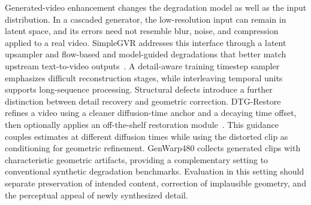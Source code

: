 Generated-video enhancement changes the degradation model as well as the input distribution. In a cascaded generator, the low-resolution input can remain in latent space, and its errors need not resemble blur, noise, and compression applied to a real video. SimpleGVR addresses this interface through a latent upsampler and flow-based and model-guided degradations that better match upstream text-to-video outputs~\cite{simplegvr}. A detail-aware training timestep sampler emphasizes difficult reconstruction stages, while interleaving temporal units supports long-sequence processing. Structural defects introduce a further distinction between detail recovery and geometric correction. DTG-Restore refines a video using a cleaner diffusion-time anchor and a decaying time offset, then optionally applies an off-the-shelf restoration module~\cite{dtgrestore}. This guidance couples estimates at different diffusion times while using the distorted clip as conditioning for geometric refinement. GenWarp480 collects generated clips with characteristic geometric artifacts, providing a complementary setting to conventional synthetic degradation benchmarks. Evaluation in this setting should separate preservation of intended content, correction of implausible geometry, and the perceptual appeal of newly synthesized detail.
